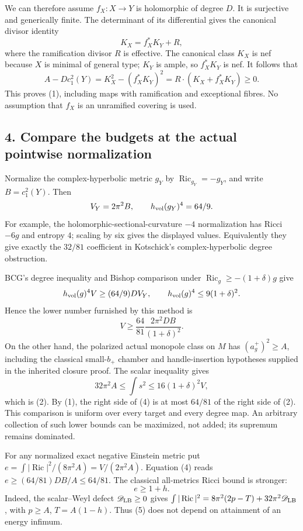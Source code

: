 \documentclass[
  11pt,
]{article}
\begin{document}
We can therefore assume \(f_X:X\to Y\) is holomorphic of degree \(D\).
It is surjective and generically finite. The determinant of its
differential gives the canonical divisor identity \[
 K_X=f_X^*K_Y+R,
\] where the ramification divisor \(R\) is effective. The canonical
class \(K_X\) is nef because \(X\) is minimal of general type; \(K_Y\)
is ample, so \(f_X^*K_Y\) is nef. It follows that \[
 A-Dc_1^2(Y)
 =K_X^2-(f_X^*K_Y)^2
 =R\cdot(K_X+f_X^*K_Y)\ge0.
\] This proves (1), including maps with ramification and exceptional
fibres. No assumption that \(f_X\) is an unramified covering is used.

\hypertarget{compare-the-budgets-at-the-actual-pointwise-normalization}{%
\subsection{4. Compare the budgets at the actual pointwise
normalization}\label{compare-the-budgets-at-the-actual-pointwise-normalization}}

Normalize the complex-hyperbolic metric \(g_Y\) by
\(\operatorname{Ric}_{g_Y}=-g_Y\), and write \(B=c_1^2(Y)\). Then \[
 V_Y=2\pi^2B,\qquad h_{\rm vol}(g_Y)^4=64/9.
\] For example, the holomorphic-sectional-curvature \(-4\) normalization
has Ricci \(-6g\) and entropy \(4\); scaling by six gives the displayed
values. Equivalently they give exactly the \(32/81\) coefficient in
Kotschick's complex-hyperbolic degree obstruction.

BCG's degree inequality and Bishop comparison under
\(\operatorname{Ric}_g\ge-(1+\delta)g\) give \[
 h_{\rm vol}(g)^4 V\ge (64/9)D V_Y,
 \qquad h_{\rm vol}(g)^4\le9(1+\delta)^2.
\] Hence the lower number furnished by this method is \[
 \boxed{V\ge\frac{64}{81}
              \frac{2\pi^2DB}{(1+\delta)^2}.}             \tag{4}
\] On the other hand, the polarized actual monopole class on \(M\) has
\((a_g^+)^2\ge A\), including the classical small-\(b_+\) chamber and
handle-insertion hypotheses supplied in the inherited closure proof. The
scalar inequality gives \[
 32\pi^2A\le\int s^2
           \le16(1+\delta)^2V,
\] which is (2). By (1), the right side of (4) is at most \(64/81\) of
the right side of (2). This comparison is uniform over every target and
every degree map. An arbitrary collection of such lower bounds can be
maximized, not added; its supremum remains dominated.

For any normalized exact negative Einstein metric put
\(e=\int|\operatorname{Ric}|^2/(8\pi^2A)=V/(2\pi^2A)\). Equation (4)
reads \(e\ge(64/81)DB/A\le64/81\). The classical all-metrics Ricci bound
is stronger: \[
 e\ge1+h.                                                \tag{5}
\] Indeed, the scalar--Weyl defect \(\mathscr D_{\rm LB}\ge0\) gives
\(\int|\operatorname{Ric}|^2  =8\pi^2(2p-T)+32\pi^2\mathscr D_{\rm LB}\),
with \(p\ge A\), \(T=A(1-h)\). Thus (5) does not depend on attainment of
an energy infimum.
\end{document}
